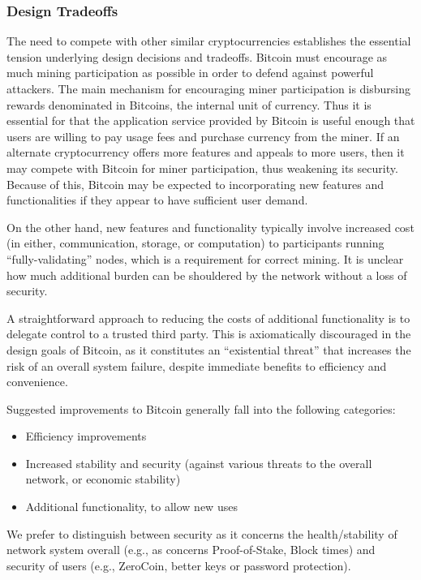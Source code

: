 \subsubsection{Design Tradeoffs}
The need to compete with other similar cryptocurrencies establishes the essential tension underlying design decisions and tradeoffs. Bitcoin must encourage as much mining participation as possible in order to defend against powerful attackers. The main mechanism for encouraging miner participation is disbursing rewards denominated in Bitcoins, the internal unit of currency. Thus it is essential for that the application service provided by Bitcoin is useful enough that users are willing to pay usage fees and purchase currency from the miner. If an alternate cryptocurrency offers more features and appeals to more users, then it may compete with Bitcoin for miner participation, thus weakening its security. Because of this, Bitcoin may be expected to incorporating new features and functionalities if they appear to have sufficient user demand.

On the other hand, new features and functionality typically involve increased cost (in either, communication, storage, or computation) to participants running ``fully-validating'' nodes, which is a requirement for correct mining. It is unclear how much additional burden can be shouldered by the network without a loss of security.

A straightforward approach to reducing the costs of additional functionality is to delegate control to a trusted third party. This is axiomatically discouraged in the design goals of Bitcoin, as it constitutes an ``existential threat'' that increases the risk of an overall system failure, despite immediate benefits to efficiency and convenience.

Suggested improvements to Bitcoin generally fall into the following categories:
\begin{itemize}
\item Efficiency improvements
\item Increased stability and security (against various threats to the overall network, or economic stability)
\item Additional functionality, to allow new uses
\end{itemize}

We prefer to distinguish between security as it concerns the health/stability of network system overall (e.g., as concerns Proof-of-Stake, Block times) and security of users (e.g., ZeroCoin, better keys or password protection).

